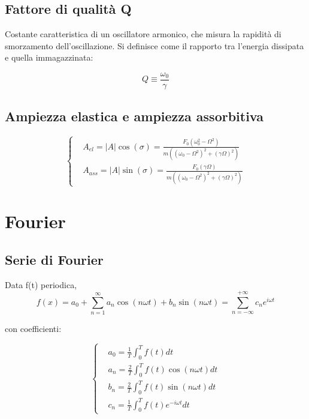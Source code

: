 \documentclass{article}
\begin{document}
\subsection{Fattore di qualità Q}
Costante caratteristica di un oscillatore armonico, che misura la rapidità di smorzamento dell'oscillazione. Si definisce come il rapporto tra l'energia dissipata e quella immagazzinata:

\begin{equation}
    Q\equiv \frac{\omega_0}{\gamma}
\end{equation}

\subsection{Ampiezza elastica e ampiezza assorbitiva}

\begin{equation}
\left\{
\begin{aligned}
    &A_{el}=|A|\cos(\sigma)= \frac{F_0(\omega_0^2-\Omega^2)}{m((\omega_0-\Omega^2)^2+(\gamma\Omega)^2)} \\
    &A_{ass}=|A|\sin(\sigma)=\frac{F_0(\gamma\Omega)}{m((\omega_0-\Omega^2)^2+(\gamma\Omega)^2)}
\end{aligned}
\right.    
\end{equation}

\section{Fourier}

\subsection{Serie di Fourier}
Data f(t) periodica,
\begin{equation}
    f(x)= a_0+\sum_{n=1}^\infty a_n\cos(n\omega t)+ b_n\sin(n\omega t)= \sum_{n=-\infty}^{+\infty} c_n e^{i\omega t}
\end{equation}

con coefficienti:

\begin{equation}
\left\{
    \begin{aligned}
        & a_0=\frac{1}{T} \int_0^T f(t) dt \\
        & a_n=\frac{2}{T} \int_0^T f(t)\cos(n\omega t) dt \\
        & b_n=\frac{2}{T} \int_0^T f(t)\sin(n\omega t) dt \\
        & c_n = \frac{1}{T}\int_0^T f(t)e^{-i\omega t} dt
    \end{aligned}
    \right.
\end{equation}
\end{document}
